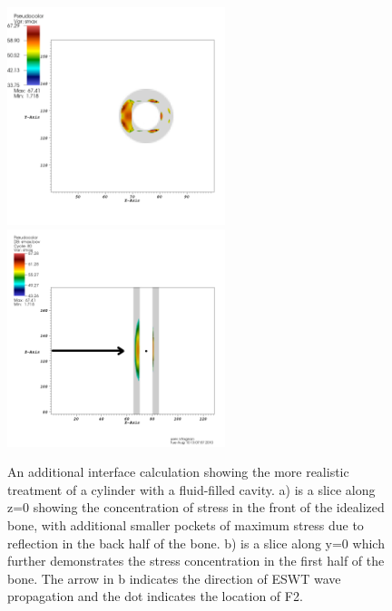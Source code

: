 \documentclass{article}
\begin{document}
\begin{figure}[h!]
\begin{center}
\includegraphics[height=2.5in]{bone_canal/bone_canal_2D_rgb_xy.pdf}\hspace{5mm}
\includegraphics[height=2.5in]{bone_canal/bone_canal_2D_rgb_xz_annotate.png}
\caption{An additional interface calculation showing the more realistic treatment of a cylinder with a fluid-filled cavity.  a) is a slice along z=0 showing the concentration of stress in the front of the idealized bone, with additional smaller pockets of maximum stress due to reflection in the back half of the bone.  b) is a slice along y=0 which further demonstrates the stress concentration in the first half of the bone.  The arrow in b indicates the direction of ESWT wave propagation and the dot indicates the location of F2.\label{fig:bone_canal}}
\end{center}

\end{figure}
\end{document}
